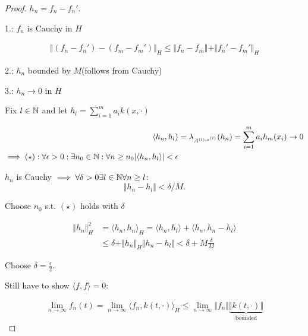 \begin{proof}
$h_n=f_n-f_n'$.

1.: $f_n$ is Cauchy in $H$

\begin{align*}
    \Vert (f_n-f_n')-(f_m-f_m')\Vert_H\leq \Vert f_n-f_m \Vert+\Vert f_n'-f_m'\Vert_H 
\end{align*}

2.: $h_n$ bounded by $M$(follows from Cauchy)

3.: $h_n\to 0$ in $H$

Fix $l\in\mathbb{N}$ and let $h_l=\sum_{i=1}^ma_ik(x,\cdot)$

\begin{align*}
    \langle h_n,h_l\rangle&=\lambda_{A^{(l),x^{(l)}}}(h_n)=\sum_{i=1}^m a_i h_m(x_i)\to 0\\
    \implies (\star): \forall \epsilon>0:\exists n_0\in\mathbb{N}:\forall n\geq n_0 |\langle h_n,h_l\rangle|<\epsilon
\end{align*}

$h_n$ is Cauchy $\implies \forall \delta>0\exists l\in\mathbb{N}\forall n\geq l$: 
\[\Vert h_n-h_l\Vert<\delta/M.\]

Choose $n_0$ s.t. $(\star)$ holds with $\delta$

\begin{align*}
    \Vert h_n\Vert_H^2&=\langle h_n,h_n\rangle_H=\langle h_n,h_l\rangle+\langle h_n,h_n-h_l\rangle\\
    &\leq \delta + \Vert h_n\Vert_H \Vert h_n-h_l\Vert<\delta+M\frac{\delta}{M}
\end{align*}

Choose $\delta=\frac{\epsilon}{2}$.

Still have to show $\langle f,f\rangle =0$:

\begin{align*}
    \lim_{n\to\infty} f_n(t)=\lim_{n\to\infty} \langle f_n,k(t,\cdot)\rangle_H\leq \lim_{n\to\infty}\Vert f_n\Vert \underbrace{\Vert k(t,\cdot)\Vert}_{\text{bounded}}
\end{align*}

\end{proof}


